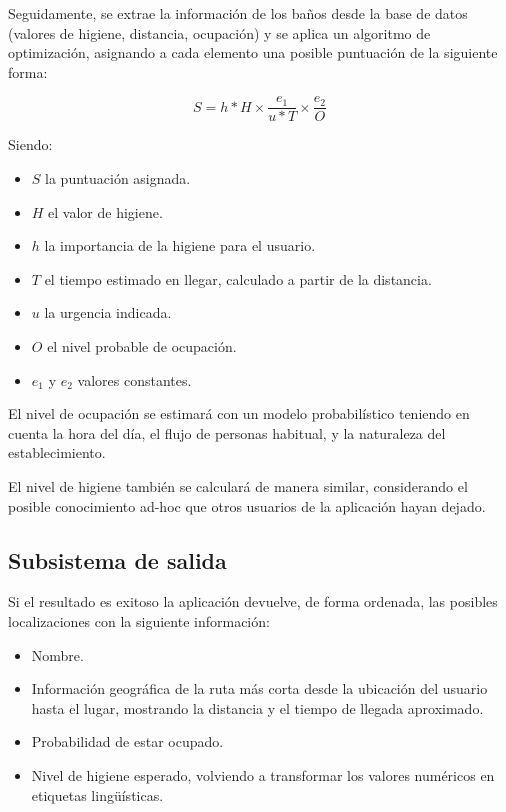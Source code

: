 \documentclass[13pt,a4paper]{article}
\begin{document}
\vspace{\baselineskip}

Seguidamente, se extrae la información de los baños desde la base de datos (valores de higiene, distancia, ocupación) y se aplica un algoritmo de optimización, asignando a cada elemento una posible puntuación de la siguiente forma:

\begin{equation}
  S = h*H \times \frac{e_{1}}{u*T} \times \frac{e_{2}}{O}
\end{equation}

Siendo:
\begin{itemize}
  \item $S$ la puntuación asignada.
  \item $H$ el valor de higiene.
  \item $h$ la importancia de la higiene para el usuario.
  \item $T$ el tiempo estimado en llegar, calculado a partir de la distancia.
  \item $u$ la urgencia indicada.
  \item $O$ el nivel probable de ocupación.
  \item $e_{1}$ y $e_{2}$ valores constantes.
\end{itemize} 

El nivel de ocupación se estimará con un modelo probabilístico teniendo en cuenta la hora del día, el flujo de personas habitual, y la naturaleza del establecimiento. 

El nivel de higiene también se calculará de manera similar, considerando el posible conocimiento ad-hoc que otros usuarios de la aplicación hayan dejado.

\subsection{Subsistema de salida}

Si el resultado es exitoso la aplicación devuelve, de forma ordenada, las posibles localizaciones con la siguiente información:

\begin{itemize}
  \item Nombre.
  \item Información geográfica de la ruta más corta desde la ubicación del usuario hasta el lugar, mostrando la distancia y el tiempo de llegada aproximado.
  \item Probabilidad de estar ocupado.
  \item Nivel de higiene esperado, volviendo a transformar los valores numéricos en etiquetas lingüísticas.
\end{itemize}
\end{document}
